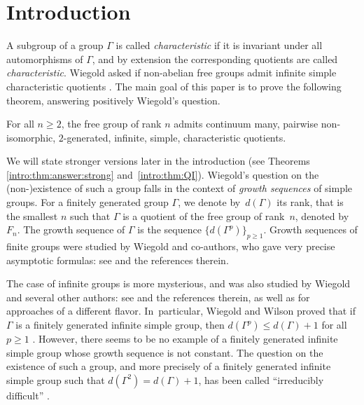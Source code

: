 \section{Introduction}

A subgroup of a group $\Gamma$ is called \emph{characteristic} if it is invariant under all automorphisms of $\Gamma$, and by extension the corresponding quotients are called \emph{characteristic}.
Wiegold asked if non-abelian free groups admit infinite simple characteristic quotients \cite[Quest.\,6.45]{kourovka}.
The main goal of this paper is to prove the following theorem, answering positively Wiegold's question.

\begin{theorem}
\label{intro:thm:answer}
For all $n \geq 2$, the free group of rank $n$ admits continuum many, pairwise non-isomorphic, $2$-generated, infinite, simple, characteristic quotients.
\end{theorem}

We will state stronger versions later in the introduction (see Theorems \ref{intro:thm:answer:strong} and~\ref{intro:thm:QI}).
Wiegold's question on the (non-)existence of such a group falls in the context of \emph{growth sequences} of simple groups. For a finitely generated group $\Gamma$, we denote by~$d(\Gamma)$ its rank, that is the smallest $n$ such that $\Gamma$ is a quotient of the free group of rank~$n$, denoted by $F_n$. The growth sequence of $\Gamma$ is the sequence $\{ d(\Gamma^p) \}_{p \geq 1}$.
Growth sequences of finite groups were studied by Wiegold and co-authors, who gave very precise asymptotic formulas: see \cite{w:finite1, w:finite6} and the references therein.

The case of infinite groups is more mysterious, and was also studied by Wiegold and several other authors: see \cite{obratsov, erfanian} and the references therein, as well as \cite{wise, bridson} for approaches of a different flavor. In~particular, Wiegold and Wilson proved that if $\Gamma$ is a finitely generated infinite simple group, then $d(\Gamma^p) \leq d(\Gamma) + 1$ for all $p \geq 1$ \cite{w:fg1}. However, there seems to be no example of a finitely generated infinite simple group whose growth sequence is not constant. The question on the existence of such a group, and more precisely of a finitely generated infinite simple group such that $d(\Gamma^2) = d(\Gamma) + 1$, has been called ``irreducibly difficult'' \cite{w:fg1, obratsov}.


